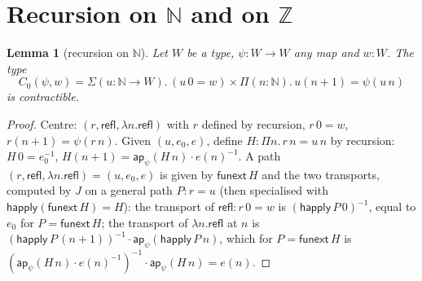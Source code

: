 \documentclass[11pt]{amsart}
\newtheorem{lemma}[theorem]{Lemma}
\theoremstyle{definition}
\theoremstyle{remark}
\newcommand{\Z}{\mathbb{Z}}
\newcommand{\N}{\mathbb{N}}
\newcommand{\cc}{\cdot}
\begin{document}
\section{Recursion on $\N$ and on $\Z$}

\begin{lemma}[recursion on $\N$]\label{lem:N}
Let $W$ be a type, $\psi:W\to W$ any map and $w:W$. The type
\[C_0(\psi,w)=\Sigma(u:\N\to W).\,(u\,0=w)\times\Pi(n:\N).\,u(n+1)=\psi(u\,n)\]
is contractible.
\end{lemma}
\begin{proof}
Centre: $(r,\mathsf{refl},\lambda n.\mathsf{refl})$ with $r$ defined by
recursion, $r\,0=w$, $r(n+1)=\psi(r\,n)$. Given $(u,e_0,e)$, define
$H:\Pi n.\,r\,n=u\,n$ by recursion: $H\,0=e_0^{-1}$,
$H(n+1)=\mathsf{ap}_\psi(H\,n)\cc e(n)^{-1}$. A path
$(r,\mathsf{refl},\lambda n.\mathsf{refl})=(u,e_0,e)$ is given by
$\mathsf{funext}\,H$ and the two transports, computed by $J$ on a general
path $P:r=u$ (then specialised with $\mathsf{happly}(\mathsf{funext}\,H)=H$):
the transport of $\mathsf{refl}:r\,0=w$ is $(\mathsf{happly}\,P\,0)^{-1}$,
equal to $e_0$ for $P=\mathsf{funext}\,H$; the transport of
$\lambda n.\mathsf{refl}$ at $n$ is
$(\mathsf{happly}\,P\,(n+1))^{-1}\cc\mathsf{ap}_\psi(\mathsf{happly}\,P\,n)$,
which for $P=\mathsf{funext}\,H$ is
$(\mathsf{ap}_\psi(H\,n)\cc e(n)^{-1})^{-1}\cc\mathsf{ap}_\psi(H\,n)=e(n)$.
\end{proof}
\end{document}
